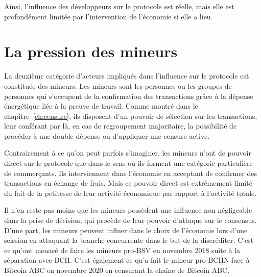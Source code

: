 Ainsi, l'influence des développeurs sur le protocole est réelle, mais elle est profondément limitée par l'intervention de l'économie si elle a lieu.

\section*{La pression des mineurs}

La deuxième catégorie d'acteurs impliqués dans l'influence sur le protocole est constituée des mineurs. Les mineurs sont les personnes ou les groupes de personnes qui s'occupent de la confirmation des transactions grâce à la dépense énergétique liée à la preuve de travail. Comme montré dans le chapitre~\ref{ch:censure}, ils disposent d'un pouvoir de sélection sur les transactions, leur conférant par là, en cas de regroupement majoritaire, la possibilité de procéder à une double dépense ou d'appliquer une censure active.

Contrairement à ce qu'on peut parfois s'imaginer, les mineurs n'ont de pouvoir direct sur le protocole que dans le sens où ils forment une catégorie particulière de commerçants. Ils interviennent dans l'économie en acceptant de confirmer des transactions en échange de frais. Mais ce pouvoir direct est extrêmement limité du fait de la petitesse de leur activité économique par rapport à l'activité totale.

Il n'en reste pas moins que les mineurs possèdent une influence non négligeable dans la prise de décision, qui procède de leur pouvoir d'attaque sur le consensus. D'une part, les mineurs peuvent influer dans le choix de l'économie lors d'une scission en attaquant la branche concurrente dans le but de la discréditer. C'est ce qu'ont menacé de faire les mineurs pro-BSV en novembre 2018 suite à la séparation avec BCH. C'est également ce qu'a fait le mineur pro-BCHN face à Bitcoin ABC en novembre 2020 en censurant la chaîne de Bitcoin ABC.

